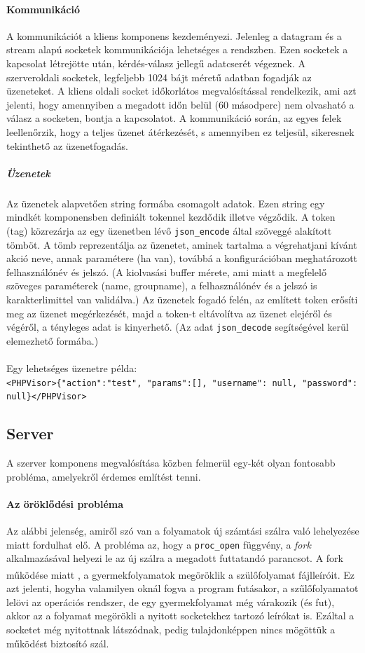 \documentclass[12pt]{report}
\begin{document}
\paragraph{Kommunikáció}
A kommunikációt a kliens komponens kezdeményezi. Jelenleg a datagram és a stream alapú socketek kommunikációja lehetséges a rendszben. Ezen socketek a kapcsolat létrejötte után, kérdés-válasz jellegű adatcserét végeznek. A szerveroldali socketek, legfeljebb 1024 bájt méretű adatban fogadják az üzeneteket. A kliens oldali socket időkorlátos megvalósítással rendelkezik, ami azt jelenti, hogy amennyiben a megadott időn belül (60 másodperc) nem olvasható a válasz a socketen, bontja a kapcsolatot.
A kommunikáció során, az egyes felek leellenőrzik, hogy a teljes üzenet átérkezését, s amennyiben ez teljesül, sikeresnek tekinthető az üzenetfogadás.
\subparagraph{Üzenetek}
Az üzenetek alapvetően string formába csomagolt adatok. Ezen string egy mindkét komponensben definiált tokennel kezdődik illetve végződik. A token (tag) közrezárja az egy üzenetben lévő \verb|json_encode| által szöveggé alakított tömböt. A tömb reprezentálja az üzenetet, aminek tartalma a végrehatjani kívánt akció neve, annak paramétere (ha van), továbbá a konfigurációban meghatározott felhasználónév és jelszó.
(A kiolvasási buffer mérete, ami miatt a megfelelő szöveges paraméterek (name, groupname), a felhasználónév és a jelszó is karakterlimittel van validálva.)
Az üzenetek fogadó felén, az említett token erősíti meg az üzenet megérkezését, majd a token-t eltávolítva az üzenet elejéről és végéről, a tényleges adat is kinyerhető. (Az adat \verb|json_decode| segítségével kerül elemezhető formába.) \\ \\


Egy lehetséges üzenetre példa: \\ \footnotesize
\verb|<PHPVisor>{"action":"test", "params":[], "username": null, "password": null}</PHPVisor>|
\normalsize
\subsection{Server}
A szerver komponens megvalósítása közben felmerül egy-két olyan fontosabb probléma, amelyekről érdemes említést tenni.
   \paragraph{Az öröklődési probléma}
   Az alábbi jelenség, amiről szó van a folyamatok új számtási szálra való lehelyezése miatt fordulhat elő. A probléma az, hogy a \verb|proc_open| függvény, a \textit{fork} alkalmazásával helyezi le az új szálra a megadott futtatandó parancsot. A fork működése miatt \textsuperscript{\cite{fork}}, a gyermekfolyamatok megöröklik a szülőfolyamat fájlleíróit. Ez azt jelenti, hogyha valamilyen oknál fogva a program futásakor, a szűlőfolyamatot lelövi az operációs rendszer, de egy gyermekfolyamat még várakozik (és fut), akkor az a folyamat megörökli a nyitott socketekhez tartozó leírókat is. Ezáltal a socketet még nyitottnak látszódnak, pedig tulajdonképpen nincs mögöttük a működést biztosító szál.
   
\end{document}
